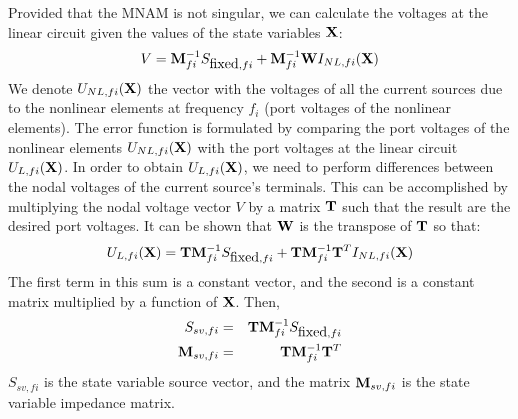 Provided that the MNAM is not singular, we can calculate the
voltages at the linear circuit given the values of the state
variables ${\bf X}$:
%
\begin{equation}
  V = {\bf M}_{fi}^{-1}  S_{\mbox{fixed},fi} + {\bf M}_{fi}^{-1} 
                                      {\bf W}  I_{NL,fi}({\bf X})
  \label{eq_voltage}
\end{equation}
%
%
We denote $U_{NL,fi}({\bf X})$ the vector with the voltages of all
the current sources due to the nonlinear elements at frequency $f_i$
(port voltages of the nonlinear elements). The error function is
formulated by comparing the port voltages of the nonlinear elements
$U_{NL,fi}({\bf X})$ with the port voltages at the linear circuit
$U_{L,fi}({\bf X})$. In order to obtain $U_{L,fi}({\bf X})$, we need
to perform differences between the nodal voltages of the current
source's terminals. This can be accomplished by multiplying the
nodal voltage vector $V$ by a matrix ${\bf T}$ such that the result
are the desired port voltages. It can be shown that ${\bf W}$ is the
transpose of ${\bf T}$ so that:
%
\begin{equation}
  U_{L,fi}({\bf X}) = {\bf T} {\bf M}_{fi}^{-1}  S_{\mbox{fixed},fi} + 
             {\bf T} {\bf M}_{fi}^{-1}  {\bf T}^T  I_{NL,fi}({\bf X})
\end{equation}
%
The first term in this sum is a constant vector, and the second is a
constant matrix multiplied by a function of ${\bf X}$. Then, 
%
\begin{eqnarray}
  S_{sv,fi} & = & {\bf T}{\bf M}_{fi}^{-1} S_{\mbox{fixed},fi} \label{eq:ssv}\\
  {\bf M}_{sv,fi} & = & {\bf T} {\bf M}_{fi}^{-1}  {\bf T}^T  \label{eq:msv}
\end{eqnarray}
%
$S_{sv,fi}$ is the state variable source vector, and the matrix
${\bf M}_{sv,fi}$ is the state variable impedance matrix.


